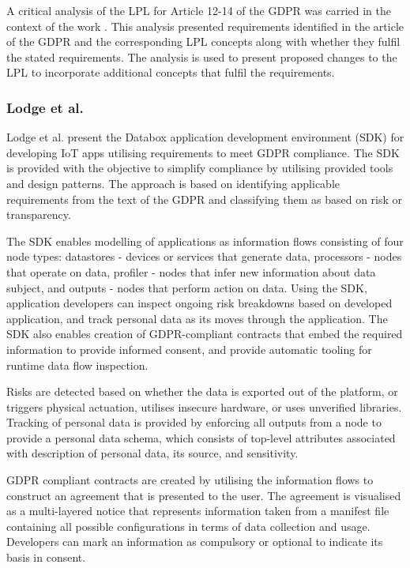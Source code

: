 A critical analysis of the LPL for Article 12-14 of the GDPR was carried in the context of the work \cite{gerl_critical_2018}. This analysis presented requirements identified in the article of the GDPR and the corresponding LPL concepts along with whether they fulfil the stated requirements.
The analysis is used to present proposed changes to the LPL to incorporate additional concepts that fulfil the requirements.

\subsubsection{Lodge et al.}
Lodge et al. \cite{garcia-alfaro_developing_2018} present the Databox application development environment (SDK) for developing IoT apps utilising requirements to meet GDPR compliance. The SDK is provided with the objective to simplify compliance by utilising provided tools and design patterns.
The approach is based on identifying applicable requirements from the text of the GDPR and classifying them as based on risk or transparency.

The SDK enables modelling of applications as information flows consisting of four node types: datastores - devices or services that generate data, processors - nodes that operate on data, profiler - nodes that infer new information about data subject, and outputs - nodes that perform action on data. Using the SDK, application developers can inspect ongoing risk breakdowns based on developed application, and track personal data as its moves through the application. The SDK also enables creation of GDPR-compliant contracts that embed the required information to provide informed consent, and provide automatic tooling for runtime data flow inspection.

Risks are detected based on whether the data is exported out of the platform, or triggers physical actuation, utilises insecure hardware, or uses unverified libraries. Tracking of personal data is provided by enforcing all outputs from a node to provide a personal data schema, which consists of top-level attributes associated with description of personal data, its source, and sensitivity.

GDPR compliant contracts are created by utilising the information flows to construct an agreement that is presented to the user. The agreement is visualised as a multi-layered notice that represents information taken from a manifest file containing all possible configurations in terms of data collection and usage. Developers can mark an information as compulsory or optional to indicate its basis in consent.


